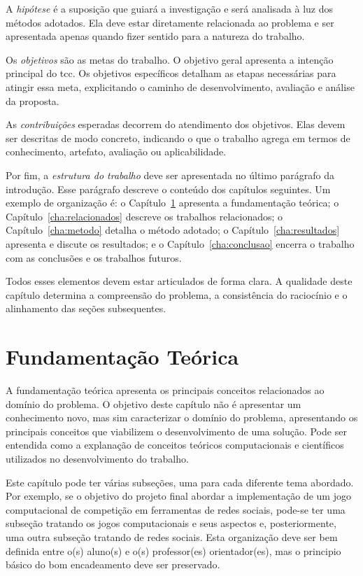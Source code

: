 \documentclass{eic-bcc-tcc}
\begin{document}
A \emph{hipótese} é a suposição que guiará a investigação e será analisada à luz dos métodos adotados. Ela deve estar diretamente relacionada ao problema e ser apresentada apenas quando fizer sentido para a natureza do trabalho.

Os \emph{objetivos} são as metas do trabalho. O objetivo geral apresenta a intenção principal do \gls{tcc}. Os objetivos específicos detalham as etapas necessárias para atingir essa meta, explicitando o caminho de desenvolvimento, avaliação e análise da proposta.

As \emph{contribuições} esperadas decorrem do atendimento dos objetivos. Elas devem ser descritas de modo concreto, indicando o que o trabalho agrega em termos de conhecimento, artefato, avaliação ou aplicabilidade.

Por fim, a \emph{estrutura do trabalho} deve ser apresentada no último parágrafo da introdução. Esse parágrafo descreve o conteúdo dos capítulos seguintes. Um exemplo de organização é: o Capítulo~\ref{cha:fundamentacao} apresenta a fundamentação teórica; o Capítulo~\ref{cha:relacionados} descreve os trabalhos relacionados; o Capítulo~\ref{cha:metodo} detalha o método adotado; o Capítulo~\ref{cha:resultados} apresenta e discute os resultados; e o Capítulo~\ref{cha:conclusao} encerra o trabalho com as conclusões e os trabalhos futuros.

Todos esses elementos devem estar articulados de forma clara. A qualidade deste capítulo determina a compreensão do problema, a consistência do raciocínio e o alinhamento das seções subsequentes.


\chapter{Fundamentação Teórica}
\label{cha:fundamentacao}

A fundamentação teórica apresenta os principais conceitos relacionados ao domínio do problema. O objetivo deste capítulo não é apresentar um conhecimento novo, mas sim caracterizar o domínio do problema, apresentando os principais conceitos que viabilizem o desenvolvimento de uma solução. Pode ser entendida como a explanação de conceitos teóricos computacionais e científicos utilizados no desenvolvimento do trabalho.

Este capítulo pode ter várias subseções, uma para cada diferente tema abordado. Por exemplo, se o objetivo do projeto final abordar a implementação de um jogo computacional de competição em ferramentas de redes sociais, pode-se ter uma subseção tratando os jogos computacionais e seus aspectos e, posteriormente, uma outra subseção tratando de redes sociais. Esta organização deve ser bem definida entre o(s) aluno(s) e o(s) professor(es) orientador(es), mas o principio básico do bom encadeamento deve ser preservado.
\end{document}
